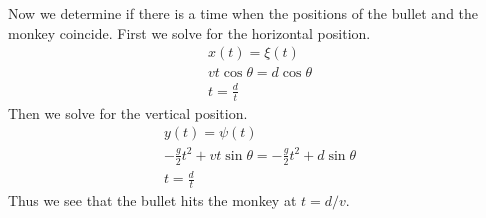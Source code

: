 {\begin{Solution}
  Now we determine if there is a time when the positions of the bullet and
  the monkey coincide.  First we solve for the horizontal position.
  \begin{gather*}
    x(t) = \xi(t)
    \\
    v t \cos \theta = d \cos \theta
    \\
    t = \frac{d}{t}
  \end{gather*}
  Then we solve for the vertical position.
  \begin{gather*}
    y(t) = \psi(t)
    \\
    - \frac{g}{2} t^2 + v t \sin \theta = - \frac{g}{2} t^2 + d \sin \theta
    \\
    t = \frac{d}{t}
  \end{gather*}
  Thus we see that the bullet hits the monkey at $t = d / v$.
\end{Solution}


\raggedbottom
}